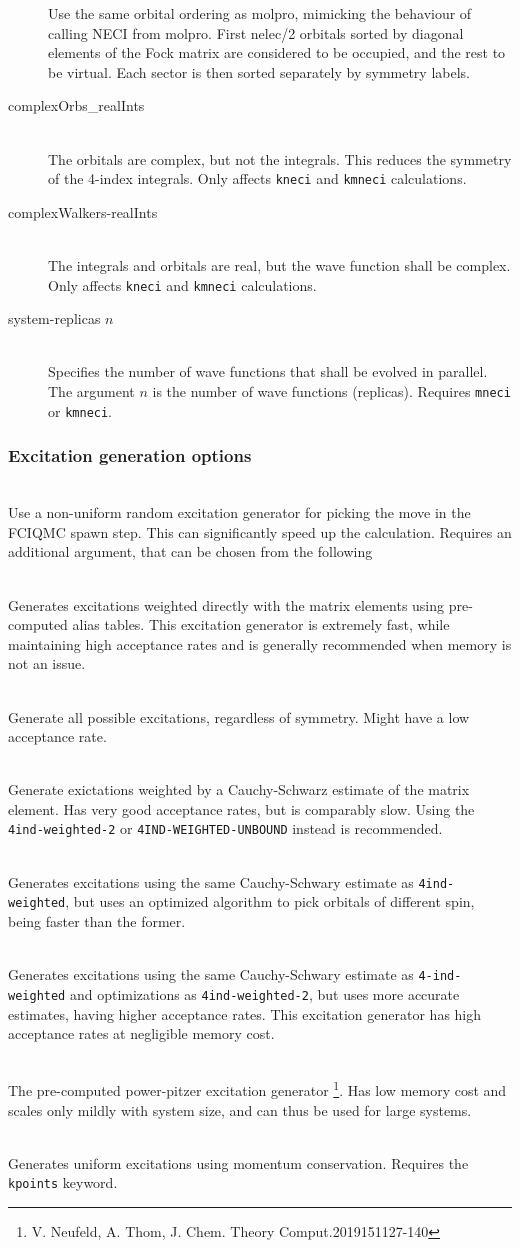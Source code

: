 \documentclass[a4paper,notitlepage,dvipsnames]{scrreprt}
\newcommand\codeitem[1]{\needspace{1.5\baselineskip}\item[\textnormal{\ttfamily #1 \nopagebreak}] \hfill \\ \nopagebreak}
\begin{document}
\begin{description}
  Use the same orbital ordering as molpro, mimicking the behaviour of calling
  NECI from molpro. First nelec/2 orbitals  sorted by diagonal elements of the Fock matrix are considered to be occupied, and the rest to be virtual. Each sector is then sorted separately by symmetry labels.
  \codeitem{complexOrbs\_realInts}
  The orbitals are complex, but not the integrals. This reduces the symmetry
  of the 4-index integrals. Only affects \texttt{kneci} and \texttt{kmneci} calculations.
  \codeitem{complexWalkers-realInts}
  The integrals and orbitals are real, but the wave function shall be
  complex. Only affects \texttt{kneci} and \texttt{kmneci} calculations.
  \codeitem{system-replicas $n$}
  Specifies the number of wave functions that shall be evolved in
  parallel. The argument $n$ is the number of
  wave functions (replicas). Requires \texttt{mneci} or \texttt{kmneci}.
\end{description}
\subsubsection{Excitation generation options}
\begin{description}
  \codeitem{\textcolor{oblue}{nonUniformRandExcits}}
  Use a non-uniform random excitation generator for picking the move in the
  FCIQMC spawn step. This can significantly speed up the calculation. Requires an additional
  argument, that can be chosen from the following
  \begin{description}
   \codeitem{\textcolor{oblue}{pchb}}
    Generates excitations weighted directly with the matrix elements using pre-computed
    alias tables. This excitation generator is extremely fast, while
    maintaining high acceptance rates and is generally recommended when
    memory is not an issue.
    \codeitem{nosymgen}
    Generate all possible excitations, regardless of symmetry. Might have a
    low acceptance rate.
    \codeitem{4ind-weighted}
    Generate exictations weighted by a Cauchy-Schwarz estimate of the matrix
    element. Has very good acceptance rates, but is comparably slow. Using the
    \texttt{4ind-weighted-2} or \texttt{4IND-WEIGHTED-UNBOUND} instead is recommended.
    \codeitem{4ind-weighted-2}
    Generates excitations using the same Cauchy-Schwary estimate as
    \texttt{4ind-weighted}, but uses an optimized algorithm to pick orbitals
    of different spin, being faster than the former.
    \codeitem{4ind-weighted-unbound}
    Generates excitations using the same Cauchy-Schwary estimate as
    \texttt{4-ind-weighted} and optimizations as \texttt{4ind-weighted-2}, but
    uses more accurate estimates, having higher acceptance rates. This
    excitation generator has high acceptance rates at negligible memory cost.
    \codeitem{pcpp}
    The pre-computed power-pitzer excitation generator \footnote{V. Neufeld,
      A. Thom, J. Chem. Theory Comput.2019151127-140}. Has low memory cost and
    scales only mildly with system size, and can thus be used for large systems.
  \end{description}
  \codeitem{lattice-excitgen}
  Generates uniform excitations using momentum conservation. Requires the
  \texttt{kpoints} keyword.
\end{description}
\end{document}
